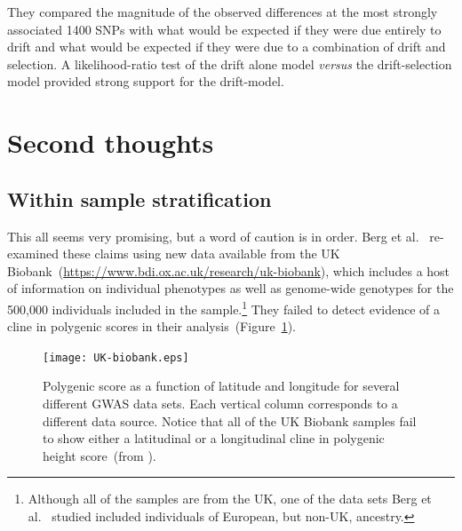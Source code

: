 \documentclass[12pt]{article}
\begin{document}
They compared the magnitude of the observed differences at the most
strongly associated 1400 SNPs with what would be expected if they were
due entirely to drift and what would be expected if they were due to a
combination of drift and selection. A likelihood-ratio test of the
drift alone model {\it versus\/} the drift-selection model provided
strong support for the drift-model.

\section*{Second thoughts}

\subsection*{Within sample stratification}

This all seems very promising, but a word of caution is in order. Berg
et al.~\cite{Berg-etal-2018} re-examined these claims using new data
available from the UK
Biobank~(\url{https://www.bdi.ox.ac.uk/research/uk-biobank}), which
includes a host of information on individual phenotypes as well as
genome-wide genotypes for the 500,000 individuals included in the
sample.\footnote{Although all of the samples are from the UK, one of
  the data sets Berg et al.~\cite{Berg-etal-2018} studied included
  individuals of European, but non-UK, ancestry.} They failed to
detect evidence of a cline in polygenic scores in their
analysis~(Figure~\ref{fig:UK-biobank}).

\begin{figure}
  \begin{center}
    \texttt{[image: UK-biobank.eps]}
  \end{center}
  \caption{Polygenic score as a function of latitude and longitude for
    several different GWAS data sets. Each vertical column corresponds
  to a different data source. Notice that all of the UK Biobank
  samples fail to show either a latitudinal or a longitudinal cline in
  polygenic height score~(from \cite{Berg-etal-2018}).}\label{fig:UK-biobank} 
\end{figure}
\end{document}
